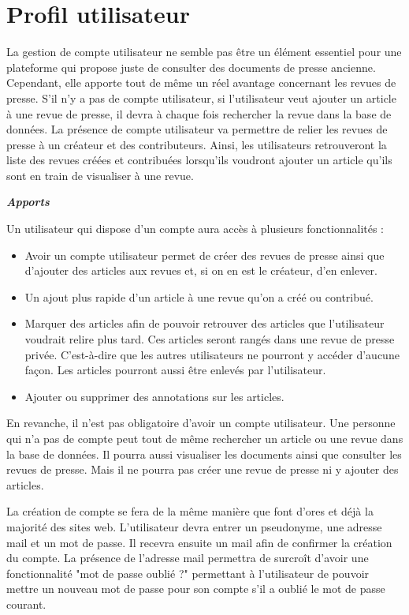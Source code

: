 \section{Profil utilisateur}
\label{sec:profil}

La gestion de compte utilisateur ne semble pas être un élément essentiel pour une plateforme qui propose juste de consulter des documents de presse ancienne. Cependant, elle apporte tout de même un réel avantage concernant les revues de presse.
S'il n'y a pas de compte utilisateur, si l'utilisateur veut ajouter un article à une revue de presse, il devra à chaque fois rechercher la revue dans la base de données.
La présence de compte utilisateur va permettre de relier les revues de presse à un créateur et des contributeurs. Ainsi, les utilisateurs retrouveront la liste des revues créées et contribuées lorsqu'ils voudront ajouter un article qu'ils sont en train de visualiser à une revue.


\textbf{\textit{Apports}}
 

Un utilisateur qui dispose d'un compte aura accès à plusieurs fonctionnalités :

\begin{itemize}
  \item Avoir un compte utilisateur permet de créer des revues de presse ainsi que d'ajouter des articles aux revues et, si on en est le créateur, d'en enlever.
  \item Un ajout plus rapide d'un article à une revue qu'on a créé ou contribué.
  \item Marquer des articles afin de pouvoir retrouver des articles que l'utilisateur voudrait relire plus tard. Ces articles seront rangés dans une revue de presse privée. C'est-à-dire que les autres utilisateurs ne pourront y accéder d'aucune façon. Les articles pourront aussi être enlevés par l'utilisateur.
	\item Ajouter ou supprimer des annotations sur les articles.
\end{itemize}

En revanche, il n'est pas obligatoire d'avoir un compte utilisateur. Une personne qui n'a pas de compte peut tout de même rechercher un article ou une revue dans la base de données. Il pourra aussi visualiser les documents ainsi que consulter les revues de presse. Mais il ne pourra pas créer une revue de presse ni y ajouter des articles.


\textbf{}


La création de compte se fera de la même manière que font d'ores et déjà la majorité des sites web. L'utilisateur devra entrer un pseudonyme, une adresse mail et un mot de passe. Il recevra ensuite un mail afin de confirmer la création du compte. La présence de l'adresse mail permettra de surcroît d'avoir une fonctionnalité "mot de passe oublié ?" permettant à l'utilisateur de pouvoir mettre un nouveau mot de passe pour son compte s'il a oublié le mot de passe courant.


